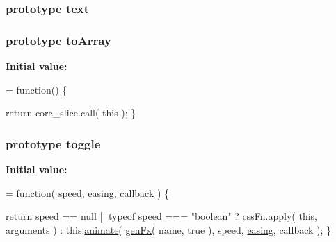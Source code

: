 \subsubsection[{text}]{ {\bf prototype} text}\label{jquery-1_810_82-vsdoc_8js_aa5b77da29631a344064bb3d20c8702de}
\hypertarget{jquery-1_810_82-vsdoc_8js_a6a1f7257e5962f80de1ab2941bc232c4}{}
\subsubsection[{to\+Array}]{ {\bf prototype} to\+Array}\label{jquery-1_810_82-vsdoc_8js_a6a1f7257e5962f80de1ab2941bc232c4}
{\bfseries Initial value\+:}
\begin{DoxyCode}
= \textcolor{keyword}{function}() \{


        \textcolor{keywordflow}{return} core\_slice.call( \textcolor{keyword}{this} );
    \}
\end{DoxyCode}
\hypertarget{jquery-1_810_82-vsdoc_8js_a2acbc13778660c4b59c393d8e4c2eb09}{}
\subsubsection[{toggle}]{ {\bf prototype} toggle}\label{jquery-1_810_82-vsdoc_8js_a2acbc13778660c4b59c393d8e4c2eb09}
{\bfseries Initial value\+:}
\begin{DoxyCode}
= \textcolor{keyword}{function}( \hyperlink{jquery-1_810_82-vsdoc_8js_add98c90065e6563cba26ff6d2016c46c}{speed}, \hyperlink{jquery-1_810_82-vsdoc_8js_a9758a312629fa6de1744280dd6e6253b}{easing}, callback ) \{


        \textcolor{keywordflow}{return} \hyperlink{jquery-1_810_82-vsdoc_8js_add98c90065e6563cba26ff6d2016c46c}{speed} == null || typeof \hyperlink{jquery-1_810_82-vsdoc_8js_add98c90065e6563cba26ff6d2016c46c}{speed} === \textcolor{stringliteral}{"boolean"} ?
            cssFn.apply( \textcolor{keyword}{this}, arguments ) :
            this.\hyperlink{jquery-1_810_82-vsdoc_8js_a956a1d08128d41115c45b6815814a64d}{animate}( \hyperlink{_bibabook_2_scripts_2jquery-1_810_82_8js_a0dad9ae6c57fd32a071de202faa87081}{genFx}( name, \textcolor{keyword}{true} ), speed, \hyperlink{jquery-1_810_82-vsdoc_8js_a9758a312629fa6de1744280dd6e6253b}{easing}, callback );
    \}
\end{DoxyCode}
\hypertarget{jquery-1_810_82-vsdoc_8js_aa7d62d93d395f57a19fbbdcfd7ff87f1}{}
